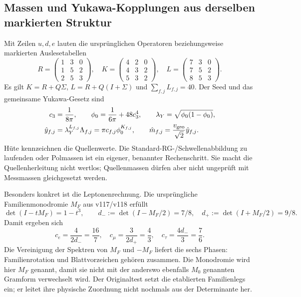 \subsection{Massen und Yukawa-Kopplungen aus derselben markierten Struktur}
Mit Zeilen $u,d,e$ lauten die ursprünglichen Operatoren beziehungsweise markierten Auslesetabellen
\begin{equation}
R=\begin{pmatrix}1&3&0\\1&5&2\\2&5&3\end{pmatrix},\quad
K=\begin{pmatrix}4&2&0\\4&3&2\\5&3&2\end{pmatrix},\quad
L=\begin{pmatrix}7&3&0\\7&5&2\\8&5&3\end{pmatrix}.
\end{equation}
Es gilt $K=R+Q\Sigma$, $L=R+Q(I+\Sigma)$ und $\sum_{f,j}L_{f,j}=40$. Der Seed und das gemeinsame Yukawa-Gesetz sind
\begin{align}
c_3&=\frac1{8\pi},\qquad \phi_0=\frac1{6\pi}+48c_3^4,
\qquad \lambda_Y=\sqrt{\phi_0(1-\phi_0)},\\
\hat y_{f,j}&=\lambda_Y^{L_{f,j}}\Lambda_{f,j}
=\pi c_{f,j}\phi_0^{K_{f,j}},\qquad
\hat m_{f,j}=\frac{v_{\rm geo}}{\sqrt2}\hat y_{f,j}.
\end{align}
Hüte kennzeichnen die Quellenwerte. Die Standard-RG-/Schwellenabbildung zu laufenden oder Polmassen ist ein eigener, benannter Rechenschritt. Sie macht die Quellenherleitung nicht wertlos; Quellenmassen dürfen aber nicht ungeprüft mit Messmassen gleichgesetzt werden.

Besonders konkret ist die Leptonenrechnung. Die ursprüngliche Familienmonodromie $M_F$ aus v117/v118 erfüllt
\begin{equation}
\det(I-tM_F)=1-t^3,\qquad d_-:=\det(I-M_F/2)=7/8,
\quad d_+:=\det(I+M_F/2)=9/8.
\end{equation}
Damit ergeben sich
\begin{equation}
c_e=\frac4{2d_-}=\frac{16}7,\quad
c_\mu=\frac3{2d_+}=\frac43,\quad
c_\tau=\frac{4d_-}3=\frac76.
\end{equation}
Die Vereinigung der Spektren von $M_F$ und $-M_F$ liefert die sechs Phasen: Familienrotation und Blattvorzeichen gehören zusammen. Die Monodromie wird hier $M_F$ genannt, damit sie nicht mit der anderswo ebenfalls $M_0$ genannten Gramform verwechselt wird. Der Originaltest setzt die etablierten Familienlegs ein; er leitet ihre physische Zuordnung nicht nochmals aus der Determinante her.

